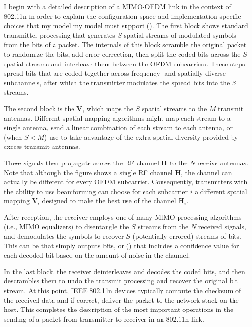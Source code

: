 I begin with a detailed description of a MIMO-OFDM link in the context of 802.11n in order to explain the configuration space and implementation-specific choices that my model my model must support (). The first block shows standard transmitter processing that generates $S$ spatial streams of modulated symbols from the bits of a packet. The internals of this block scramble the original packet to randomize the bits, add error correction, then split the coded bits across the $S$ spatial streams and interleave them between the OFDM subcarriers. These steps spread bits that are coded together across frequency- and spatially-diverse subchannels, after which the transmitter modulates the spread bits into the $S$ streams.

The second block is the  $\mathbf{V}$, which maps the $S$ spatial streams to the $M$ transmit antennas. Different spatial mapping algorithms might map each stream to a single antenna, send a linear combination of each stream to each antenna, or (when $S<M$) use  to take advantage of the extra spatial diversity provided by excess transmit antennas.

These signals then propagate across the RF channel $\mathbf{H}$ to the $N$ receive antennas. Note that although the figure shows a single RF channel $\mathbf{H}$, the channel can actually be different for every OFDM subcarrier. Consequently, transmitters with the ability to use beamforming can choose for each subcarrier $i$ a different spatial mapping $\mathbf{V}_i$ designed to make the best use of the channel $\mathbf{H}_i$.

After reception, the receiver employs one of many MIMO processing algorithms (i.e., MIMO equalizers) to disentangle the $S$ streams from the $N$ received signals, and demodulates the symbols to recover $S$ (potentially errored) streams of bits. This can be  that simply outputs bits, or  (\cite[\S5.3.1.3]{Sklar,Jamieson_PPR}) that includes a confidence value for each decoded bit based on the amount of noise in the channel.

In the last block, the receiver deinterleaves and decodes the coded bits, and then descrambles them to undo the transmit processing and recover the original bit stream. At this point, IEEE 802.11n devices typically compute the checksum of the received data and if correct, deliver the packet to the network stack on the host. This completes the description of the most important operations in the sending of a packet from transmitter to receiver in an 802.11n link.

